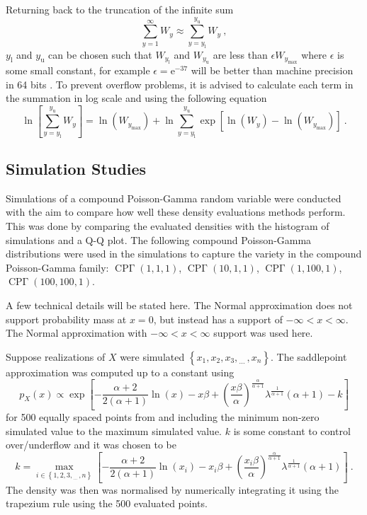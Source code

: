 \documentclass[12pt, a4paper]{memoir}
\DeclareMathOperator{\CPoisson}{CP\Gamma}
\newcommand{\euler}{\mathrm{e}}
\newcommand{\dotdotdot}{_{\phantom{.}\cdots}}
\begin{document}
Returning back to the truncation of the infinite sum
\begin{equation}
	\sum_{y=1}^\infty W_y \approx \sum_{y=y_\text{l}}^{y_\text{u}}W_y
	\ ,
\end{equation}
$y_\text{l}$ and $y_\text{u}$ can be chosen such that $W_{y_\text{l}}$ and $W_{y_\text{u}}$ are less than $\epsilon W_{y_\text{max}}$ where $\epsilon$ is some small constant, for example $\epsilon=\euler^{-37}$ will be better than machine precision in 64 bits \citep{dunn2005series}. To prevent overflow problems, it is advised to calculate each term in the summation in log scale \citep{dunn2005series} and using the following equation
\begin{equation}
	\ln\left[
		\sum_{y=y_\text{l}}^{y_\text{u}}W_y
	\right]
	= 
	\ln\left(
		W_{y_\text{max}}
	\right)
	+\ln\sum_{y=y_\text{l}}^{y_\text{u}}
	\exp\left[
		\ln\left(W_y\right)-\ln\left(W_{y_\text{max}}\right)
	\right]
	\ .
\end{equation}

\subsection{Simulation Studies}

Simulations of a compound Poisson-Gamma random variable were conducted with the aim to compare how well these density evaluations methods perform. This was done by comparing the evaluated densities with the histogram of simulations and a Q-Q plot. The following compound Poisson-Gamma distributions were used in the simulations to capture the variety in the compound Poisson-Gamma family: $\CPoisson(1,1,1)$, $\CPoisson(10,1,1)$, $\CPoisson(1,100,1)$, $\CPoisson(100,100,1)$.

A few technical details will be stated here. The Normal approximation does not support probability mass at $x=0$, but instead has a support of $-\infty<x<\infty$. The Normal approximation with $-\infty<x<\infty$ support was used here.

Suppose realizations of $X$ were simulated $\left\{x_1,x_2,x_3,\dotdotdot,x_n\right\}$. The saddlepoint approximation was computed up to a constant using
\begin{equation}
	p_X(x) \propto
	\exp\left[
		-\frac{\alpha+2}{2(\alpha+1)}
		\ln(x)
		-x\beta
		+\left(
		\frac{x\beta}{\alpha}
		\right)^{\frac{\alpha}{\alpha+1}}\lambda^{\frac{1}{\alpha+1}}(\alpha+1) - k
	\right]
\end{equation}
for 500 equally spaced points from and including the minimum non-zero simulated value to the maximum simulated value. $k$ is some constant to control over/underflow and it was chosen to be
\begin{equation}
	k =
	\max_{i\in\left\{1,2,3,\dotdotdot,n\right\}}
	\left[
		-\frac{\alpha+2}{2(\alpha+1)}
		\ln(x_i)
		-x_i\beta
		+\left(
			\frac{x_i\beta}{\alpha}
		\right)^{\frac{\alpha}{\alpha+1}}\lambda^{\frac{1}{\alpha+1}}(\alpha+1)
	\right]
	\ .
\end{equation}
The density was then was normalised by numerically integrating it using the trapezium rule using the 500 evaluated points.
\end{document}
